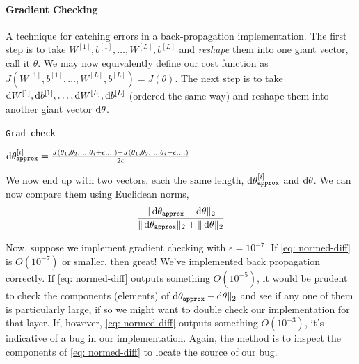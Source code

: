 \documentclass[12pt]{article}
\begin{document}
\paragraph{Gradient Checking} A technique for catching errors in a back-propagation implementation. The first step is to take
$W^{[1]}, b^{[1]}, \ldots, W^{[L]}, b^{[L]}$ and \emph{reshape} 
them into one giant vector, call it $\theta$. We may now 
equivalently define our cost function as 
 $J(W^{[1]}, b^{[1]}, \ldots, W^{[L]}, b^{[L]}) = J(\theta)$.
The next step is to take $\operatorname{d}\!{W}^{[1]}, \operatorname{d}\!{b}^{[1]}, \ldots, \operatorname{d}\!{W}^{[L]}, \operatorname{d}\!{b}^{[L]}$ (ordered the same way) and reshape them into another giant vector $\operatorname{d}\!{\theta}$.

\begin{algorithm}
  \caption{\texttt{Grad-check}}    {
    $\operatorname{d}\!{\theta}_{\texttt{approx}}^{[i]} = \frac{J(\theta_1, \theta_2, \ldots, \theta_i + \epsilon, \ldots) - J(\theta_1, \theta_2, \ldots, \theta_i - \epsilon, \ldots)}{2\epsilon}$
  } \end{algorithm}
We now end up with two vectors, each the same length, $\operatorname{d}\!{\theta}_{\texttt{approx}}^{[i]}$ and $\operatorname{d}\!{\theta}$. We can now compare them using Euclidean norms,
\begin{equation}
\label{eq: normed-diff}
\frac{\| \operatorname{d}\!{\theta}_{\texttt{approx}} - \operatorname{d}\!{\theta}\|_2}{\|\operatorname{d}\!{\theta}_{\texttt{approx}}\|_2 + \| \operatorname{d}\!{\theta} \|_2}
\end{equation}

Now, suppose we implement gradient checking with $\epsilon = 10^{-7}$. If \ref{eq: normed-diff} is $O(10^{-7})$ or smaller, then great! We've implemented back propagation correctly. If \ref{eq: normed-diff} outputs something $O(10^{-5})$, it would be prudent to check the components (elements) of $\operatorname{d}\!{\theta}_{\texttt{approx}} - \operatorname{d}\!{\theta}\|_2$ and see if any one of them is particularly large, if so we might want to double check our implementation for that layer. If, however, \ref{eq: normed-diff} outputs something $O(10^{-3})$, it's indicative of a bug in our implementation. Again, the method is to inspect the components of \ref{eq: normed-diff} to locate the source of our bug.
\end{document}
